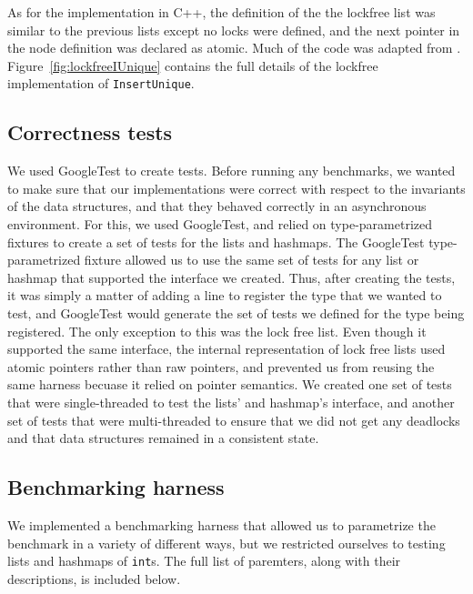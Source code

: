 \documentclass[11pt]{article}
\begin{document}
As for the implementation in C++, the definition of the the lockfree list was
similar to the previous  lists except no locks were defined, and the next
pointer in the node definition was  declared as atomic. Much of the code was
adapted from \cite{Harris}. Figure~\ref{fig:lockfreeIUnique}  contains the full
details of the lockfree implementation of {\tt InsertUnique}.

\subsection{Correctness tests}
We used GoogleTest to create tests. Before running any benchmarks, we wanted to
make sure that our implementations were correct with respect to the invariants
of the data structures, and that they behaved correctly in an asynchronous
environment. For this, we used GoogleTest, and relied on type-parametrized
fixtures to create a set of tests for the lists and hashmaps. The GoogleTest
type-parametrized fixture allowed us to use the same set of tests for any list
or hashmap that supported the interface we created. Thus, after creating the
tests, it was simply a matter of adding a line to register the type that we
wanted to test, and GoogleTest would generate the set of tests we defined for
the type being registered. The only exception to this was the lock free list.
Even though it supported the same interface, the internal representation of lock
free lists used atomic pointers rather than raw pointers, and prevented us from
reusing the same harness becuase it relied on pointer semantics. We created
one set of tests that were single-threaded to test the lists' and hashmap's
interface, and another set of tests that were multi-threaded to ensure that we
did not get any deadlocks and that data structures remained in a consistent
state.

\subsection{Benchmarking harness}
We implemented a benchmarking harness that allowed us to parametrize the
benchmark in a variety of different ways, but we restricted ourselves to testing
lists and hashmaps of {\tt int}s. The full list of paremters, along with their
descriptions, is included below.
\end{document}
